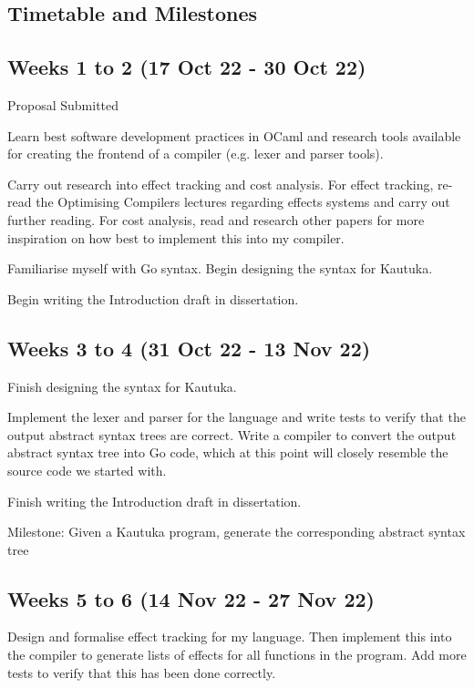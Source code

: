 \begin{refsection}
  \newpage 

  \section{Timetable and Milestones}

  \subsection*{Weeks 1 to 2 (17 Oct 22 - 30 Oct 22)}
  Proposal Submitted

  Learn best software development practices in OCaml and research tools available for creating the frontend of a compiler (e.g. lexer and parser tools). 

  Carry out research into effect tracking and cost analysis. For effect tracking, re-read the Optimising Compilers lectures regarding effects systems \cite{Optimising-Compilers-Lecture-13-Effect-Systems} and carry out further reading. For cost analysis, read \cite{10.1145/361002.361016} and research other papers for more inspiration on how best to implement this into my compiler.

  Familiarise myself with Go syntax. Begin designing the syntax for Kautuka.

  Begin writing the Introduction draft in dissertation.

  \subsection*{Weeks 3 to 4 (31 Oct 22 - 13 Nov 22)}

  Finish designing the syntax for Kautuka. 

  Implement the lexer and parser for the language and write tests to verify that the output abstract syntax trees are correct. Write a compiler to convert the output abstract syntax tree into Go code, which at this point will closely resemble the source code we started with. 

  Finish writing the Introduction draft in dissertation.

  Milestone: Given a Kautuka program, generate the corresponding abstract syntax tree 

  \subsection*{Weeks 5 to 6 (14 Nov 22 - 27 Nov 22)}

  Design and formalise effect tracking for my language. Then implement this into the compiler to generate lists of effects for all functions in the program. Add more tests to verify that this has been done correctly.


\end{refsection}
